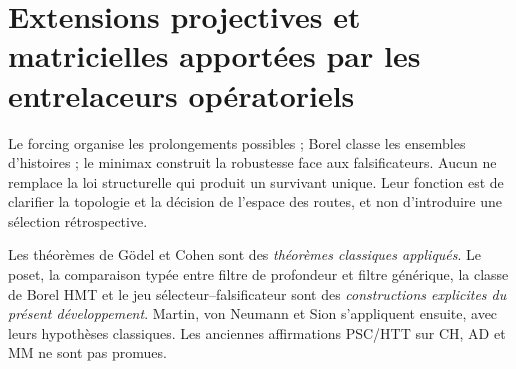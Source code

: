 \section{Extensions projectives et matricielles apportées par les entrelaceurs opératoriels}

Le forcing organise les prolongements possibles ; Borel classe les ensembles
d'histoires ; le minimax construit la robustesse face aux falsificateurs. Aucun ne remplace
la loi structurelle qui produit un survivant unique. Leur fonction est
de clarifier la topologie et la décision de l'espace des routes, et non d'introduire une
sélection rétrospective.

\begin{remark}
Les théorèmes de Gödel et Cohen sont des \emph{théorèmes classiques appliqués}. Le
poset, la comparaison typée entre filtre de profondeur et filtre générique,
la classe de Borel HMT et le jeu sélecteur--falsificateur sont des
\emph{constructions explicites du présent développement}. Martin, von Neumann et Sion s'appliquent
ensuite, avec leurs hypothèses classiques. Les anciennes affirmations PSC/HTT sur
CH, AD et MM ne sont pas promues.
\end{remark}
